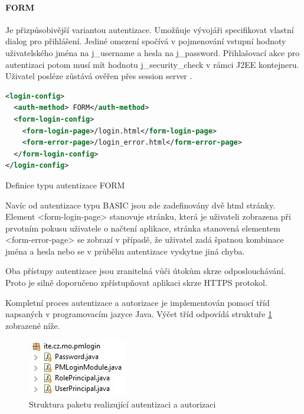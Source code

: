 \documentclass[thesis=M,czech]{FITthesis}[2012/06/26]
\begin{document}
\paragraph{FORM} Je přizpůsobivější variantou autentizace. Umožňuje vývojáři specifikovat vlastní dialog pro přihlášení. Jediné omezení spočívá v pojmenování vstupní hodnoty uživatelského jména na j\_username a hesla na j\_password. Přihlašovací akce pro autentizaci potom musí mít hodnotu j\_security\_check v rámci J2EE kontejneru. Uživatel posléze zůstává ověřen přes session server \cite{basic_form}.

\begin{algorithm}[H]	
	\begin{lstlisting}[language = XML]  
<login-config> 
  <auth-method> FORM</auth-method> 
  <form-login-config> 
    <form-login-page>/login.html</form-login-page>
    <form-error-page>/login_error.html</form-error-page>
  </form-login-config> 
</login-config>
	\end{lstlisting}
	\caption{Definice typu autentizace FORM}	
	\label{code:auth_form_def}
	\small Navíc od autentizace typu BASIC jsou zde zadefinovány dvě html stránky. Element <form-login-page> stanovuje stránku, která je uživateli zobrazena při prvotním pokusu uživatele o načtení aplikace, stránka stanovená elementem <form-error-page> se zobrazí v případě, že uživatel zadá špatnou kombinace jména a hesla nebo se v průběhu autentizace vyskytne jiná chyba.
\end{algorithm}	

Oba přístupy autentizace jsou zranitelná vůči útokům skrze odposlouchávání. Proto je silně doporučeno zpřístupňovat aplikaci skrze HTTPS protokol. 

Kompletní proces autentizace a autorizace je implementován pomocí tříd napsaných v programovacím jazyce Java. Výčet tříd odpovídá struktuře \ref{img:loginmodule_structure} zobrazené níže. 

\begin{figure}[H]
	\centering
	\includegraphics[]{images/loginmodule_structure}
	\caption{Struktura paketu realizující autentizaci a autorizaci}
	\label{img:loginmodule_structure}
\end{figure}
\end{document}
